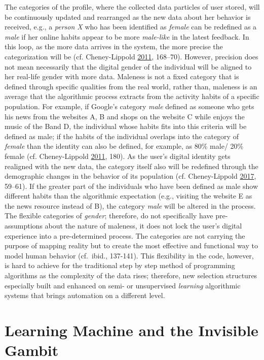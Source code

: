 \documentclass[12pt,twoside]{report}
\begin{document}
The categories of the profile, where the collected data particles of user stored, will be continuously updated and rearranged as the new data about her behavior is received, e.g., a \emph{person X} who has been identified as \emph{female} can be redefined as a \emph{male} if her online habits appear to be more \emph{male-like} in the latest feedback. In this loop, as the more data arrives in the system, the more precise the categorization will be (cf. Cheney-Lippold \protect\hyperlink{ref-Cheney2011}{2011}, 168--70). However, precision does not mean necessarily that the digital gender of the individual will be aligned to her real-life gender with more data. Maleness is not a fixed category that is defined through specific qualities from the real world, rather than, maleness is an average that the algorithmic process extracts from the activity habits of a specific population. For example, if Google's category \emph{male} defined as someone who gets his news from the websites A, B and shops on the website C while enjoys the music of the Band D, the individual whose habits fits into this criteria will be defined as male; if the habits of the individual overlaps into the category of \emph{female} than the identity can also be defined, for example, as 80\% male/ 20\% female (cf. Cheney-Lippold \protect\hyperlink{ref-Cheney2011}{2011}, 180). As the user's digital identity gets realigned with the new data, the category itself also will be redefined through the demographic changes in the behavior of its population (cf. Cheney-Lippold \protect\hyperlink{ref-Cheney2017}{2017}, 59--61). If the greater part of the individuals who have been defined as male show different habits than the algorithmic expectation (e.g., visiting the website E as the news resource instead of B), the category \emph{male} will be altered in the process. The flexible categories of \emph{gender}; therefore, do not specifically have pre-assumptions about the nature of maleness, it does not lock the user's digital experience into a pre-determined process. The categories are not carrying the purpose of mapping reality but to create the most effective and functional way to model human behavior (cf.~ibid., 137-141). This flexibility in the code, however, is hard to achieve for the traditional step by step method of programming algorithms as the complexity of the data rises; therefore, new selection structures especially built and enhanced on semi- or unsupervised \emph{learning} algorithmic systems that brings automation on a different level.

\hypertarget{learning-machine-and-the-invisible-gambit}{%
\section{Learning Machine and the Invisible Gambit}\label{learning-machine-and-the-invisible-gambit}}
\end{document}
